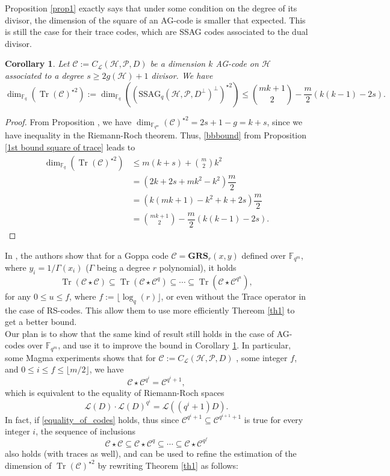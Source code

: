 \documentclass[a4paper]{article}
\newtheorem{coro1}{Corollary}
\newcommand{\calP}{\mathcal{P}}
\newcommand{\calH}{\mathcal{H}}
\newcommand{\calL}{\mathcal{L}}
\newcommand{\calC}{\mathcal{C}}
\newcommand{\Tr}{\operatorname{Tr}}
\newcommand{\fqm}{\mathbb{F}_{q^m}}
\newcommand{\fq}{\mathbb{F}_{q}}
\begin{document}
Proposition \ref{prop1} exactly says that under some condition on the degree of its divisor, the dimension of the square of an AG-code is smaller that expected. This is still the case for their trace codes, which are SSAG codes associated to the dual divisor.

\begin{coro1} \label{square_ssag_bound}
Let $\mathcal{C} := C_{\calL}(\calH,\mathcal{P},D)$ be a dimension $k$ AG-code on $\calH$ associated to a degree $s \geq 2g(\calH)+1$ divisor. We have 
\[ \dim_{\fq}(\Tr(\mathcal{C})^{\star2}) := \dim_{\fq} ((\mathrm{SSAG}_{q}(\calH,\calP,D^{\perp})^{\perp})^{\star2})  \leq \binom{mk+1}{2} - \dfrac{m}{2} (k(k-1)-2s).\]
\end{coro1}

\begin{proof}
From Proposition \label{Prop1}, we have $\dim_{\fqm}(\calC)^{\star2} = 2s+1-g = k+s$, since we have inequality in the Riemann-Roch theorem. Thus, \eqref{bbbound} from Proposition \ref{1st bound square of trace} leads to
\begin{align*}
    \dim_{\fq}(\Tr(\mathcal{C})^{\star2}) &\leq m(k+s) + \binom{m}{2}k^2 \\
                                        &= (2k+2s+mk^2-k^2) \dfrac{m}{2} \\
                                        &= (k(mk+1)-k^2+k+2s) \dfrac{m}{2} \\
                                        &= \binom{mk+1}{2} - \dfrac{m}{2}(k(k-1)-2s) .
\end{align*}
\end{proof}

In \cite{rocco}, the authors show that for a Goppa code $\calC = \mathbf{GRS}_r(x,y)$ defined over $\mathbb{F}_{q^m}$, where $y_i = 1/\Gamma(x_i)$ ($\Gamma$ being a degree $r$ polynomial), it holds
\[\Tr(\calC\star\calC) \subseteq \Tr(\calC\star\calC^{q}) \subseteq \cdots \subseteq \Tr(\calC\star\calC^{q^u}),\]
for any $0 \leq u \leq f$,
where $f :=\lfloor\log_q(r)\rfloor $, or even without the Trace operator in the case of RS-codes. This allow them to use more efficiently Thereom \ref{th1} to get a better bound. \\
Our plan is to show that the same kind of result still holds in the case of AG-codes over $\mathbb{F}_{q^m}$, and use it to improve the bound in Corollary \ref{square_ssag_bound}. In particular, some Magma experiments shows that for $\mathcal{C} := C_{\calL}(\calH,\mathcal{P},D)$ , some integer $f$, and $0 \leq i \leq f \leq \lfloor m/2 \rfloor$, we have
\begin{equation} \label{equality_of_codes}
 \calC \star \calC^{q^i} = \calC^{q^i+1},
\end{equation}
which is equivalent to the equality of Riemann-Roch spaces
\[ \calL(D) \cdot \calL(D)^{q^i} = \calL((q^i+1)D).\]
In fact, if \eqref{equality_of_codes} holds, thus since 
$\calC^{q^i+1} \subseteq \calC^{q^{i+1}+1}$ is true for every integer $i$, the sequence of inclusions 
\[\calC\star\calC \subseteq \calC\star\calC^{q} \subseteq \cdots \subseteq \calC\star\calC^{q^f}\]
also holds (with traces as well), and can be used to refine the estimation of the dimension of $\Tr(\calC)^{\star2}$ by rewriting Theorem \ref{th1} as follows:
\end{document}
